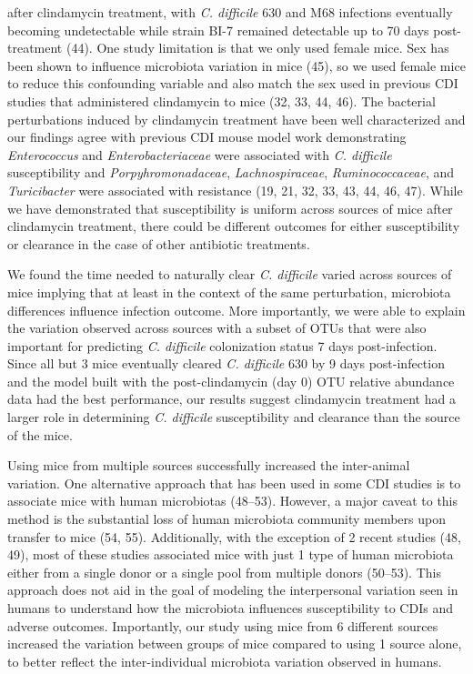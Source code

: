 \documentclass[
  11pt,
]{article}
\begin{document}
after clindamycin treatment, with \emph{C. difficile} 630 and M68
infections eventually becoming undetectable while strain BI-7 remained
detectable up to 70 days post-treatment (44). One study limitation is
that we only used female mice. Sex has been shown to influence
microbiota variation in mice (45), so we used female mice to reduce this
confounding variable and also match the sex used in previous CDI studies
that administered clindamycin to mice (32, 33, 44, 46). The bacterial
perturbations induced by clindamycin treatment have been well
characterized and our findings agree with previous CDI mouse model work
demonstrating \emph{Enterococcus} and \emph{Enterobacteriaceae} were
associated with \emph{C. difficile} susceptibility and
\emph{Porpyhromonadaceae}, \emph{Lachnospiraceae},
\emph{Ruminococcaceae}, and \emph{Turicibacter} were associated with
resistance (19, 21, 32, 33, 43, 44, 46, 47). While we have demonstrated
that susceptibility is uniform across sources of mice after clindamycin
treatment, there could be different outcomes for either susceptibility
or clearance in the case of other antibiotic treatments.

We found the time needed to naturally clear \emph{C. difficile} varied
across sources of mice implying that at least in the context of the same
perturbation, microbiota differences influence infection outcome. More
importantly, we were able to explain the variation observed across
sources with a subset of OTUs that were also important for predicting
\emph{C. difficile} colonization status 7 days post-infection. Since all
but 3 mice eventually cleared \emph{C. difficile} 630 by 9 days
post-infection and the model built with the post-clindamycin (day 0) OTU
relative abundance data had the best performance, our results suggest
clindamycin treatment had a larger role in determining \emph{C.
difficile} susceptibility and clearance than the source of the mice.

Using mice from multiple sources successfully increased the inter-animal
variation. One alternative approach that has been used in some CDI
studies is to associate mice with human microbiotas (48--53). However, a
major caveat to this method is the substantial loss of human microbiota
community members upon transfer to mice (54, 55). Additionally, with the
exception of 2 recent studies (48, 49), most of these studies associated
mice with just 1 type of human microbiota either from a single donor or
a single pool from multiple donors (50--53). This approach does not aid
in the goal of modeling the interpersonal variation seen in humans to
understand how the microbiota influences susceptibility to CDIs and
adverse outcomes. Importantly, our study using mice from 6 different
sources increased the variation between groups of mice compared to using
1 source alone, to better reflect the inter-individual microbiota
variation observed in humans.
\end{document}
